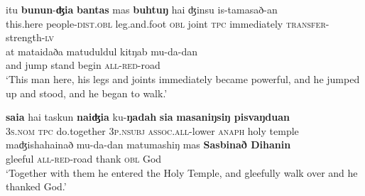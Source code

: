 \documentclass[output=paper
,modfonts
,nonflat]{langsci/langscibook}
\begin{document}
\begin{exe}
	\label{tx3-8}
	\begin{xlist}
		\ex\label{tx3-8a}
		\gll itu  \textbf{bunun}-\textbf{ʤia}  \textbf{bantas}  mas  \textbf{buhtuŋ}  hai  ʤinsu  is-tamasað-an\\
		this.here  people-\textsc{dist}.\textsc{obl}  leg.and.foot  \textsc{obl}  joint  \textsc{tpc}  immediately  \textsc{transfer}-strength-\textsc{lv}\\
		\ex\label{tx3-8b}
		\gll at  mataidaða  matuduldul  kitŋab  mu-da-dan\\
		and  jump  stand  begin  \textsc{all}-\textsc{red}-road\\
		\glt `This man here, his legs and joints immediately became powerful, and he jumped up and stood, and he began to walk.’
	\end{xlist}
\end{exe}

\begin{exe}
	\label{tx3-9}
	\begin{xlist}
		\ex\label{tx3-9a}
		\gll \textbf{saia}  hai  taskun  \textbf{naiʤia}  ku-\textbf{ŋadah}  \textbf{sia}  \textbf{masaniŋsiŋ  pisvaŋduan}\\
		\textsc{3s.nom  tpc}  do.together  \textsc{3p.nsubj}  \textsc{assoc.all}{}-lower  \textsc{anaph}  holy  temple\\
		\ex\label{tx3-9b}
		\gll maʤishahainað  mu-da-dan  matumashiŋ  mas  \textbf{Sasbinað Dihanin}\\
		gleeful  \textsc{all-red}{}-road  thank  \textsc{obl}  God\\
		\glt `Together with them he entered the Holy Temple, and gleefully walk over and he thanked God.’
	\end{xlist}
\end{exe}
\end{document}
